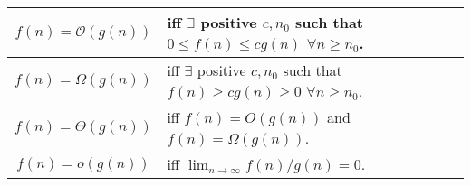 \begin{tabu} to \linewidth {c|X[c,m]}
  $f(n) = \mathcal{O}(g(n))$ & iff $\exists$ positive $c, n_0$ such that
  $0 \leq f(n) \leq cg(n)$ $\forall n \geq n_0$. \\ \hline
  $f(n) = \Omega(g(n))$ & iff $\exists$ positive $c, n_0$ such that
  $f(n) \geq cg(n) \geq 0$ $\forall n \geq n_0$. \\ \hline
  $f(n) = \Theta(g(n))$ & \vspace{0.7\baselineskip} iff $f(n) = O(g(n))$ and
  $f(n) = \Omega(g(n))$. \newline \vspace{-0.2\baselineskip}
  \\ \hline
  $f(n) = o(g(n))$ & \vspace{0.7\baselineskip} iff $\lim_{n \to \infty}
  f(n)/g(n) = 0$. \newline \vspace{-0.2\baselineskip} \\ \hline
\end{tabu}
